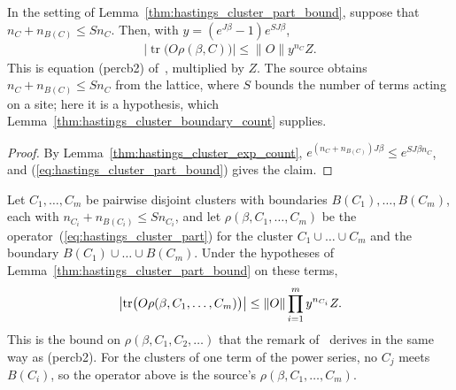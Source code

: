 \begin{lemma}
    \label{thm:hastings_cluster_part_percb2}
    \leanok
    In the setting of Lemma~\ref{thm:hastings_cluster_part_bound}, suppose that
    $n_C+n_{B(C)}\le Sn_C$. Then, with $y=(e^{J\beta}-1)e^{SJ\beta}$,
    \begin{align}
        \left|\operatorname{tr}\bigl(O\rho(\beta,C)\bigr)\right|
        \le\|O\|y^{n_C}Z.
        \label{eq:hastings_cluster_part_percb2}
    \end{align}
    This is equation (percb2) of~\cite[lines 1186--1195]{Hastings2006Solving},
    multiplied by $Z$. The source obtains $n_C+n_{B(C)}\le Sn_C$ from
    the lattice, where $S$ bounds the number of terms acting on a site; here it
    is a hypothesis, which Lemma~\ref{thm:hastings_cluster_boundary_count}
    supplies.
\end{lemma}

\begin{proof}
    \leanok
    By Lemma~\ref{thm:hastings_cluster_exp_count},
    $e^{(n_C+n_{B(C)})J\beta}\le e^{SJ\beta n_C}$, and
    (\ref{eq:hastings_cluster_part_bound}) gives the claim.
\end{proof}

\begin{lemma}
    \label{thm:hastings_cluster_part_several}
    \leanok
    Let $C_1,\dots,C_m$ be pairwise disjoint clusters with boundaries
    $B(C_1),\dots,B(C_m)$, each with $n_{C_i}+n_{B(C_i)}\le Sn_{C_i}$, and let
    $\rho(\beta,C_1,\dots,C_m)$ be the operator~(\ref{eq:hastings_cluster_part})
    for the cluster $C_1\cup\dots\cup C_m$ and the boundary
    $B(C_1)\cup\dots\cup B(C_m)$. Under the hypotheses of
    Lemma~\ref{thm:hastings_cluster_part_bound} on these terms,
    \begin{align}
        \left|\operatorname{tr}\bigl(O\rho(\beta,C_1,\dots,C_m)\bigr)\right|
        \le\|O\|\prod_{i=1}^m y^{n_{C_i}}Z.\notag
    \end{align}
    This is the bound on $\rho(\beta,C_1,C_2,\dots)$ that the remark
    of~\cite[lines 1218--1224]{Hastings2006Solving} derives in the same way as
    (percb2). For the clusters of one term of the power series, no $C_j$ meets
    $B(C_i)$, so the operator above is the source's $\rho(\beta,C_1,\dots,C_m)$.
\end{lemma}

